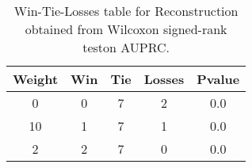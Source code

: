 \begin{table}[H]
\centering
\begin{tabular}{|c|c|c|c|c|}

\textbf{Weight} &  \textbf{Win} &  \textbf{Tie} &  \textbf{Losses} &  \textbf{Pvalue} \\
\hline

              0 &             0 &             7 &                2 &              0.0 \\
\hline
             10 &             1 &             7 &                1 &              0.0 \\
\hline
              2 &             2 &             7 &                0 &              0.0 \\
\hline

\end{tabular}
\caption{Win-Tie-Losses table for Reconstruction obtained from Wilcoxon signed-rank teston AUPRC.}
\label{tab:reconstruction_weighted_cae_comparison}
\end{table}